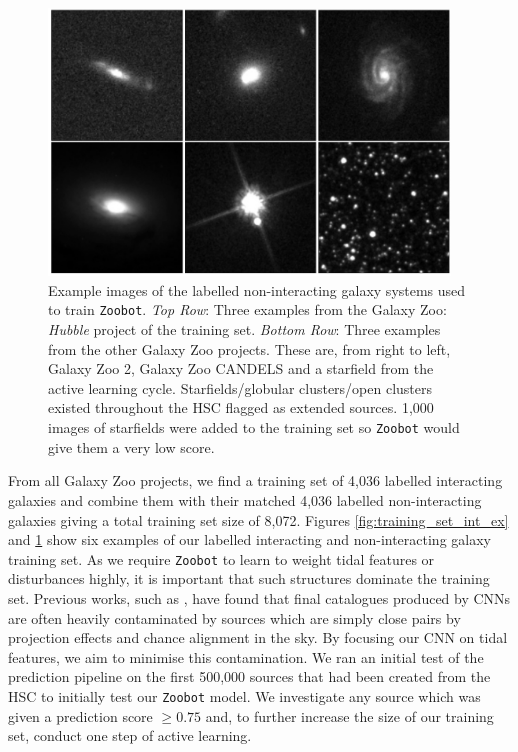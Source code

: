 \begin{figure}
  \centering
  \includegraphics[width=0.95\textwidth]{Chapter2/figures/fig2.jpeg}
  \caption[Example images of the labelled non-interacting galaxy systems used to train \texttt{Zoobot}]{Example images of the labelled non-interacting galaxy systems used to train \texttt{Zoobot}. \textit{Top Row}: Three examples from the Galaxy Zoo: \emph{Hubble} project of the training set. \textit{Bottom Row}: Three examples from the other Galaxy Zoo projects. These are, from right to left, Galaxy Zoo 2, Galaxy Zoo CANDELS and a starfield from the active learning cycle. Starfields/globular clusters/open clusters existed throughout the HSC flagged as extended sources. 1,000 images of starfields were added to the training set so \texttt{Zoobot} would give them a very low score.}
  \label{fig:training_set_non_ex}
\end{figure}

From all Galaxy Zoo projects, we find a training set of 4,036 labelled interacting galaxies and combine them with their matched 4,036 labelled non-interacting galaxies giving a total training set size of 8,072. Figures \ref{fig:training_set_int_ex} and \ref{fig:training_set_non_ex} show six examples of our labelled interacting and non-interacting galaxy training set. As we require \texttt{Zoobot} to learn to weight tidal features or disturbances highly, it is important that such structures dominate the training set. Previous works, such as \citet{2019A&A...631A..51P}, have found that final catalogues produced by CNNs are often heavily contaminated by sources which are simply close pairs by projection effects and chance alignment in the sky. By focusing our CNN on tidal features, we aim to minimise this contamination. We ran an initial test of the prediction pipeline on the first 500,000 sources that had been created from the HSC to initially test our \texttt{Zoobot} model. We investigate any source which was given a prediction score $\geq 0.75$ and, to further increase the size of our training set, conduct one step of active learning.

